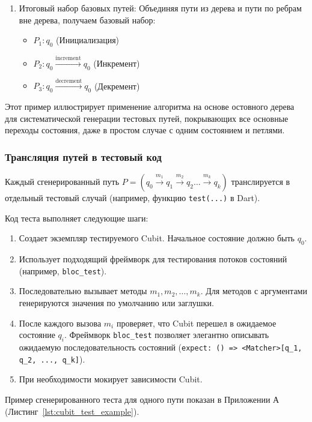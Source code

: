 \documentclass[14pt, russian]{scrartcl}
\begin{document}
\begin{enumerate}
    \item {Итоговый набор базовых путей:} Объединяя пути из дерева и пути по ребрам вне дерева, получаем базовый набор:
        \begin{itemize}
            \item $P_1: q_0$ (Инициализация)
            \item $P_2: q_0 \xrightarrow{\text{increment}} q_0$ (Инкремент)
            \item $P_3: q_0 \xrightarrow{\text{decrement}} q_0$ (Декремент)
        \end{itemize}
\end{enumerate}

Этот пример иллюстрирует применение алгоритма на основе остовного дерева для систематической генерации тестовых путей, покрывающих все основные переходы состояния, даже в простом случае с одним состоянием и петлями.



\subsubsection{Трансляция путей в тестовый код}

Каждый сгенерированный путь $P = (q_0 \xrightarrow{m_1} q_1 \xrightarrow{m_2} q_2 \dots \xrightarrow{m_k} q_k)$ транслируется в отдельный тестовый случай (например, функцию \texttt{test(...)} в Dart).

Код теста выполняет следующие шаги:
\begin{enumerate}
    \item Создает экземпляр тестируемого Cubit. Начальное состояние должно быть $q_0$.
    \item Использует подходящий фреймворк для тестирования потоков состояний (например, \texttt{bloc\_test}).
    \item Последовательно вызывает методы $m_1, m_2, \dots, m_k$. Для методов с аргументами генерируются значения по умолчанию или заглушки.
    \item После каждого вызова $m_i$ проверяет, что Cubit перешел в ожидаемое состояние $q_i$. Фреймворк \texttt{bloc\_test} позволяет элегантно описывать ожидаемую последовательность состояний (\texttt{expect: () => <Matcher>[q\_1, q\_2, ..., q\_k]}).
    \item При необходимости мокирует зависимости Cubit.
\end{enumerate}

Пример сгенерированного теста для одного пути показан в Приложении А (Листинг~\ref{lst:cubit_test_example}).
\end{document}
